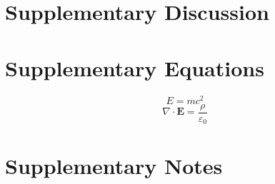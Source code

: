 \documentclass[12pt]{article}
\begin{document}
\section*{Supplementary Discussion}
\label{sec:supp-discussion}
\lipsum[2] %

\section*{Supplementary Equations}
\label{sec:supp-equations}
\begin{equation}
E = mc^2
\end{equation}
\begin{equation}
\nabla \cdot \mathbf{E} = \frac{\rho}{\varepsilon_0}
\end{equation}

\section*{Supplementary Notes}
\label{sec:supp-notes}
\lipsum[3] %
\end{document}
